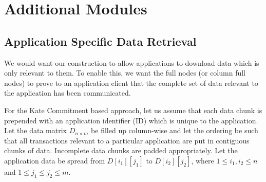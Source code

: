 \documentclass[sigconf, screen=true, nonacm]{acmart}
\newcommand{\DA}{\textit{DA layer}}
\begin{document}
        

\section{Additional Modules}
    \subsection{Application Specific Data Retrieval}
        We would want our construction to allow applications to download data which is only relevant to them. To enable this, we want the full nodes (or column full nodes) to prove to an application client that the complete set of data relevant to the application has been communicated.

        

        For the Kate Commitment based approach, let us assume that each data chunk is prepended with an application identifier (ID) which is unique to the application. 
        Let the data matrix $D_{n \times m}$ be filled up column-wise and let the ordering be such that all transactions relevant to a particular application are put in contiguous chunks of data. Incomplete data chunks are padded appropriately. Let the application data be spread from $D[i_1][j_1]$ to $D[i_2][j_2]$, where $1 \leq i_1, i_2 \leq n$ and $1 \leq j_1 \leq j_2 \leq m$.   
\end{document}

